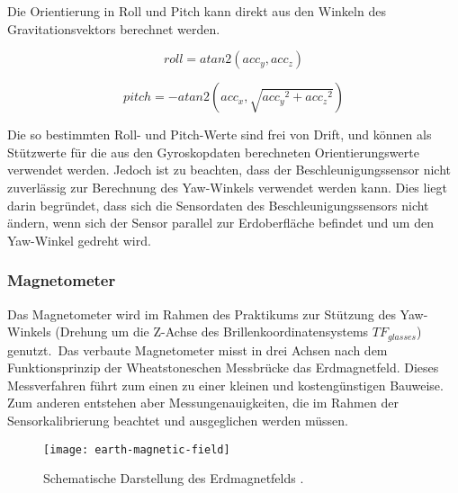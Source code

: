 
Die Orientierung in Roll und Pitch kann direkt aus den Winkeln des Gravitationsvektors berechnet werden.

\begin{equation}
    roll = atan2(acc_y, acc_z)
\end{equation}

\begin{equation}
    pitch = -atan2(acc_x, \sqrt{ {acc_y}^2 + {acc_z}^2 })
\end{equation}

Die so bestimmten Roll- und Pitch-Werte sind frei von Drift, und können als Stützwerte für die aus den Gyroskopdaten berechneten Orientierungswerte verwendet werden.
Jedoch ist zu beachten, dass der Beschleunigungssensor nicht zuverlässig zur Berechnung des Yaw-Winkels verwendet werden kann.
Dies liegt darin begründet, dass sich die Sensordaten des Beschleunigungssensors nicht ändern, wenn sich der Sensor parallel zur Erdoberfläche befindet und um den Yaw-Winkel gedreht wird.





\subsubsection{Magnetometer}
\label{headtracking_magnetometer_subsubsec}

Das Magnetometer wird im Rahmen des Praktikums zur Stützung des Yaw-Winkels (Drehung um die Z-Achse des Brillenkoordinatensystems $TF_{glasses}$) genutzt.\
Das verbaute Magnetometer misst in drei Achsen nach dem Funktionsprinzip der Wheatstoneschen Messbrücke \cite{renaudin2010complete} das Erdmagnetfeld.
Dieses Messverfahren führt zum einen zu einer kleinen und kostengünstigen Bauweise.
Zum anderen entstehen aber Messungenauigkeiten, die im Rahmen der Sensorkalibrierung beachtet und ausgeglichen werden müssen.

\begin{figure}[h]
   \centering
   \texttt{[image: earth-magnetic-field]}
   \caption[mag_world]{Schematische Darstellung des Erdmagnetfelds \cite{mag_world_source}.}
   \label{fig:mag_world}
\end{figure}

